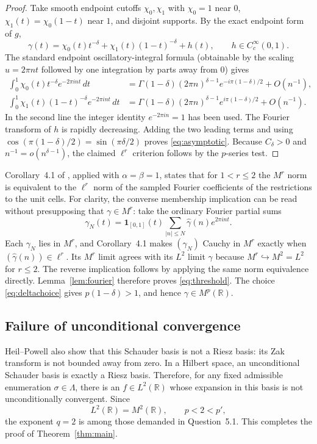 \documentclass[11pt]{article}
\newcommand{\R}{\mathbb R}
\begin{document}
\begin{proof}
Take smooth endpoint cutoffs $\chi_0,\chi_1$ with $\chi_0=1$ near $0$,
$\chi_1(t)=\chi_0(1-t)$ near $1$, and disjoint supports.  By the exact
endpoint form of $g$,
\[
 \gamma(t)=\chi_0(t)t^{-\delta}
       +\chi_1(t)(1-t)^{-\delta}+h(t),
 \qquad h\in C_c^\infty(0,1).
\]
The standard endpoint oscillatory-integral formula (obtainable by the
scaling $u=2\pi nt$ followed by one integration by parts away from $0$)
gives
\begin{align*}
 \int_0^1\chi_0(t)t^{-\delta}e^{-2\pi int}\,dt
 &=\Gamma(1-\delta)(2\pi n)^{\delta-1}
   e^{-i\pi(1-\delta)/2}+O(n^{-1}),\\
 \int_0^1\chi_1(t)(1-t)^{-\delta}e^{-2\pi int}\,dt
 &=\Gamma(1-\delta)(2\pi n)^{\delta-1}
   e^{ i\pi(1-\delta)/2}+O(n^{-1}).
\end{align*}
In the second line the integer identity $e^{-2\pi in}=1$ has been used.
The Fourier transform of $h$ is rapidly decreasing.  Adding the two leading
terms and using
$\cos(\pi(1-\delta)/2)=\sin(\pi\delta/2)$ proves
\eqref{eq:asymptotic}.  Because $C_\delta>0$ and
$n^{-1}=o(n^{\delta-1})$, the claimed $\ell^r$ criterion follows by the
$p$-series test.
\end{proof}

Corollary~4.1 of \cite{Yu}, applied with $\alpha=\beta=1$, states that for
$1<r\leq2$ the $M^r$ norm is equivalent to the $\ell^r$ norm of the sampled
Fourier coefficients of the restrictions to the unit cells.  For clarity,
the converse membership implication can be read without presupposing that
$\gamma\in M^r$: take the ordinary Fourier partial sums
\[
 \gamma_N(t)=\mathbf 1_{[0,1]}(t)
       \sum_{|n|\leq N}\widehat\gamma(n)e^{2\pi int}.
\]
Each $\gamma_N$ lies in $M^r$, and Corollary~4.1 makes $(\gamma_N)$ Cauchy in
$M^r$ exactly when $(\widehat\gamma(n))\in\ell^r$.  Its $M^r$ limit agrees
with its $L^2$ limit $\gamma$ because $M^r\hookrightarrow M^2=L^2$ for
$r\leq2$.  The reverse implication follows by applying the same norm
equivalence directly.  Lemma~\ref{lem:fourier} therefore proves
\eqref{eq:threshold}.  The choice \eqref{eq:deltachoice} gives
$p(1-\delta)>1$, and hence $\gamma\in M^p(\R)$.

\subsection*{Failure of unconditional convergence}

Heil--Powell also show that this Schauder basis is not a Riesz basis: its Zak
transform is not bounded away from zero.  In a Hilbert space, an
unconditional Schauder basis is exactly a Riesz basis.  Therefore, for any
fixed admissible enumeration $\sigma\in\Lambda$, there is an $f\in L^2(\R)$
whose expansion in this basis is not unconditionally convergent.  Since
\[
 L^2(\R)=M^2(\R),\qquad p<2<p',
\]
the exponent $q=2$ is among those demanded in Question~5.1.  This completes
the proof of Theorem~\ref{thm:main}.
\end{document}
